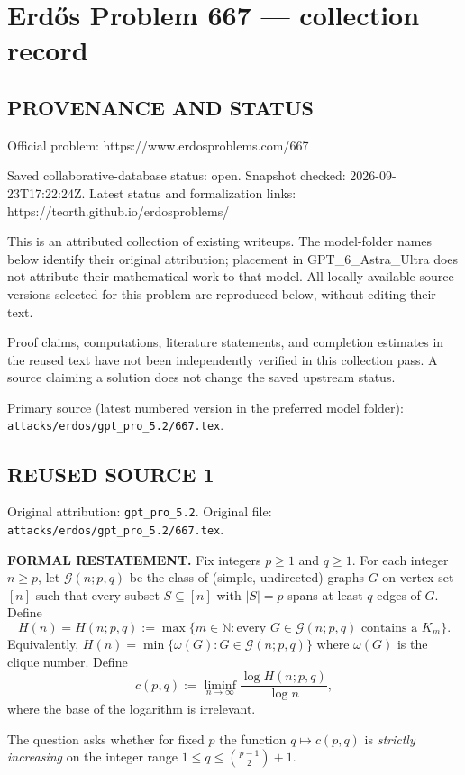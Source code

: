 \section*{Erd\H{o}s Problem 667 --- collection record}

\subsection*{PROVENANCE AND STATUS}
Official problem: https://www.erdosproblems.com/667

Saved collaborative-database status: open.
Snapshot checked: 2026-09-23T17:22:24Z.
Latest status and formalization links: https://teorth.github.io/erdosproblems/

This is an attributed collection of existing writeups. The model-folder names below identify their original attribution; placement in GPT\_6\_Astra\_Ultra does not attribute their mathematical work to that model. All locally available source versions selected for this problem are reproduced below, without editing their text.

Proof claims, computations, literature statements, and completion estimates in the reused text have not been independently verified in this collection pass. A source claiming a solution does not change the saved upstream status.

Primary source (latest numbered version in the preferred model folder): \texttt{attacks/erdos/gpt\_pro\_5.2/667.tex}.

\subsection*{REUSED SOURCE 1}
Original attribution: \texttt{gpt\_pro\_5.2}.
Original file: \texttt{attacks/erdos/gpt\_pro\_5.2/667.tex}.



\noindent\textbf{FORMAL RESTATEMENT.}
Fix integers $p\ge 1$ and $q\ge 1$.
For each integer $n\ge p$, let $\mathcal{G}(n;p,q)$ be the class of (simple, undirected) graphs $G$ on vertex set $[n]$ such that every subset $S\subseteq [n]$ with $|S|=p$ spans at least $q$ edges of $G$.
Define
\[
H(n)=H(n;p,q) := \max\big\{ m\in\mathbb{N} : \text{every } G\in\mathcal{G}(n;p,q) \text{ contains a } K_m\big\}.
\]
Equivalently, $H(n)=\min\{\omega(G): G\in\mathcal{G}(n;p,q)\}$ where $\omega(G)$ is the clique number.
Define
\[
c(p,q) := \liminf_{n\to\infty} \frac{\log H(n;p,q)}{\log n},
\]
where the base of the logarithm is irrelevant.

The question asks whether for fixed $p$ the function $q\mapsto c(p,q)$ is \emph{strictly increasing} on the integer range
$1\le q\le \binom{p-1}{2}+1$.

